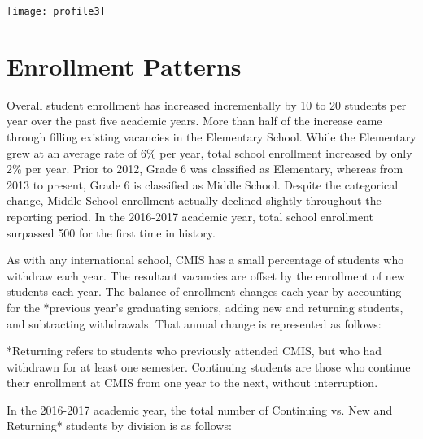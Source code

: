 \texttt{[image: profile3]}

\section{Enrollment Patterns}


Overall student enrollment has increased incrementally by 10 to 20 students per year over the past five academic years.  More than half of the increase came through filling existing vacancies in the Elementary School.  While the Elementary grew at an average rate of 6\% per year, total school enrollment increased by only 2\% per year.  Prior to 2012, Grade 6 was classified as Elementary, whereas from 2013 to present, Grade 6 is classified as Middle School.  Despite the categorical change, Middle School enrollment actually declined slightly throughout the reporting period.  In the 2016-2017 academic year, total school enrollment surpassed 500 for the first time in history.  

As with any international school, CMIS has a small percentage of students who withdraw each year. The resultant vacancies are offset by the enrollment of new students each year.  The balance of enrollment changes each year by accounting for the *previous year’s graduating seniors, adding new and returning students, and subtracting withdrawals.  That annual change is represented as follows:




*Returning refers to students who previously attended CMIS, but who had withdrawn for at least one semester.  Continuing students are those who continue their enrollment at CMIS from one year to the next, without interruption.  

In the 2016-2017 academic year, the total number of Continuing vs. New and Returning* students by division is as follows:

